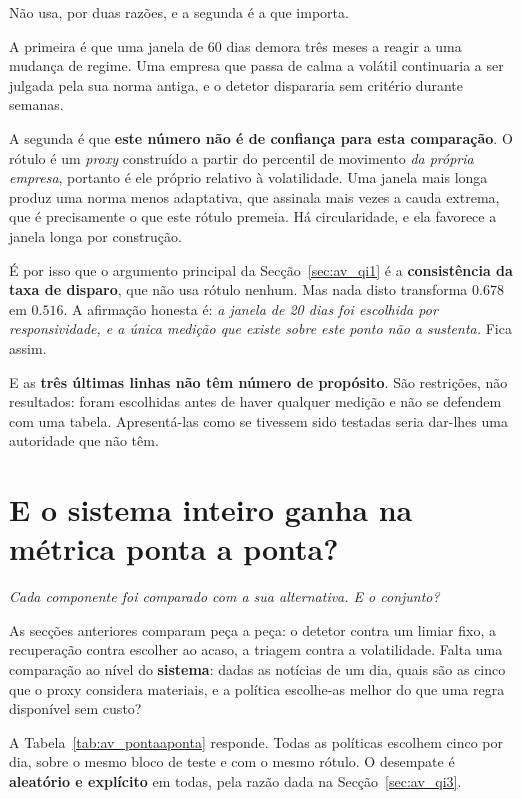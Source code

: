 Não usa, por duas razões, e a segunda é a que importa.

A primeira é que uma janela de 60 dias demora três meses a reagir a uma mudança de regime. Uma
empresa que passa de calma a volátil continuaria a ser julgada pela sua norma antiga, e o detetor
dispararia sem critério durante semanas.

A segunda é que \textbf{este número não é de confiança para esta comparação}. O rótulo é um
\emph{proxy} construído a partir do percentil de movimento \emph{da própria empresa}, portanto é ele
próprio relativo à volatilidade. Uma janela mais longa produz uma norma menos adaptativa, que
assinala mais vezes a cauda extrema, que é precisamente o que este rótulo premeia. Há circularidade,
e ela favorece a janela longa por construção.

É por isso que o argumento principal da Secção~\ref{sec:av_qi1} é a \textbf{consistência da taxa de
disparo}, que não usa rótulo nenhum. Mas nada disto transforma $0.678$ em $0.516$. A afirmação
honesta é: \emph{a janela de 20 dias foi escolhida por responsividade, e a única medição que
existe sobre este ponto não a sustenta.} Fica assim.

E as \textbf{três últimas linhas não têm número de propósito}. São restrições, não resultados: foram
escolhidas antes de haver qualquer medição e não se defendem com uma tabela. Apresentá-las como se
tivessem sido testadas seria dar-lhes uma autoridade que não têm.

\section{E o sistema inteiro ganha na métrica ponta a ponta?}
\label{sec:av_pontaaponta}

\emph{Cada componente foi comparado com a sua alternativa. E o conjunto?}

As secções anteriores comparam peça a peça: o detetor contra um limiar fixo, a recuperação contra
escolher ao acaso, a triagem contra a volatilidade. Falta uma comparação ao nível do
\textbf{sistema}: dadas as notícias de um dia, quais são as cinco que o proxy considera materiais,
e a política escolhe-as melhor do que uma regra disponível sem custo?

A Tabela~\ref{tab:av_pontaaponta} responde. Todas as políticas escolhem cinco por dia, sobre o
mesmo bloco de teste e com o mesmo rótulo. O desempate é \textbf{aleatório e explícito} em todas,
pela razão dada na Secção~\ref{sec:av_qi3}.


